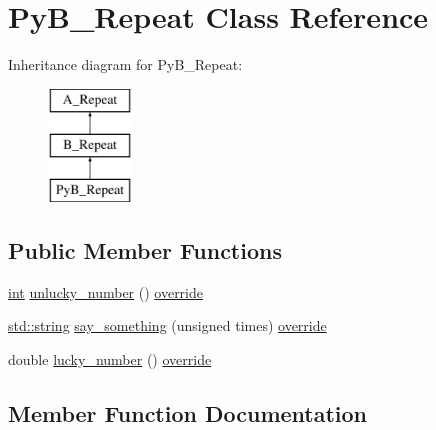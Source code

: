 \hypertarget{class_py_b___repeat}{}\section{Py\+B\+\_\+\+Repeat Class Reference}
\label{class_py_b___repeat}
Inheritance diagram for Py\+B\+\_\+\+Repeat\+:\begin{figure}[H]
\begin{center}
\leavevmode
\includegraphics[height=3.000000cm]{class_py_b___repeat}
\end{center}
\end{figure}
\subsection*{Public Member Functions}
\begin{DoxyCompactItemize}
\item 
\mbox{\hyperlink{warnings_8h_a74f207b5aa4ba51c3a2ad59b219a423b}{int}} \mbox{\hyperlink{class_py_b___repeat_a83d9f51319d6475a83c72dcef4049bd9}{unlucky\+\_\+number}} () \mbox{\hyperlink{dictobject_8h_a055cf4fd16bde9bce026127362cee1a3}{override}}
\item 
\mbox{\hyperlink{_s_d_l__opengl__glext_8h_ab4ccfaa8ab0e1afaae94dc96ef52dde1}{std\+::string}} \mbox{\hyperlink{class_py_b___repeat_a1640acd7dd1456e2d50e3ed8dce6a9ff}{say\+\_\+something}} (unsigned times) \mbox{\hyperlink{dictobject_8h_a055cf4fd16bde9bce026127362cee1a3}{override}}
\item 
double \mbox{\hyperlink{class_py_b___repeat_a71946edd1238ecd501853c380f1cf5e0}{lucky\+\_\+number}} () \mbox{\hyperlink{dictobject_8h_a055cf4fd16bde9bce026127362cee1a3}{override}}
\end{DoxyCompactItemize}


\subsection{Member Function Documentation}
\mbox{\label{class_py_b___repeat_a71946edd1238ecd501853c380f1cf5e0}} 
